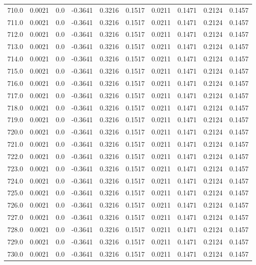 \begin{longtable}{lrrrrrrrrr}
710.0 & 0.0021 & 0.0 & -0.3641 & 0.3216 & 0.1517 & 0.0211 & 0.1471 & 0.2124 & 0.1457 \\
711.0 & 0.0021 & 0.0 & -0.3641 & 0.3216 & 0.1517 & 0.0211 & 0.1471 & 0.2124 & 0.1457 \\
712.0 & 0.0021 & 0.0 & -0.3641 & 0.3216 & 0.1517 & 0.0211 & 0.1471 & 0.2124 & 0.1457 \\
713.0 & 0.0021 & 0.0 & -0.3641 & 0.3216 & 0.1517 & 0.0211 & 0.1471 & 0.2124 & 0.1457 \\
714.0 & 0.0021 & 0.0 & -0.3641 & 0.3216 & 0.1517 & 0.0211 & 0.1471 & 0.2124 & 0.1457 \\
715.0 & 0.0021 & 0.0 & -0.3641 & 0.3216 & 0.1517 & 0.0211 & 0.1471 & 0.2124 & 0.1457 \\
716.0 & 0.0021 & 0.0 & -0.3641 & 0.3216 & 0.1517 & 0.0211 & 0.1471 & 0.2124 & 0.1457 \\
717.0 & 0.0021 & 0.0 & -0.3641 & 0.3216 & 0.1517 & 0.0211 & 0.1471 & 0.2124 & 0.1457 \\
718.0 & 0.0021 & 0.0 & -0.3641 & 0.3216 & 0.1517 & 0.0211 & 0.1471 & 0.2124 & 0.1457 \\
719.0 & 0.0021 & 0.0 & -0.3641 & 0.3216 & 0.1517 & 0.0211 & 0.1471 & 0.2124 & 0.1457 \\
720.0 & 0.0021 & 0.0 & -0.3641 & 0.3216 & 0.1517 & 0.0211 & 0.1471 & 0.2124 & 0.1457 \\
721.0 & 0.0021 & 0.0 & -0.3641 & 0.3216 & 0.1517 & 0.0211 & 0.1471 & 0.2124 & 0.1457 \\
722.0 & 0.0021 & 0.0 & -0.3641 & 0.3216 & 0.1517 & 0.0211 & 0.1471 & 0.2124 & 0.1457 \\
723.0 & 0.0021 & 0.0 & -0.3641 & 0.3216 & 0.1517 & 0.0211 & 0.1471 & 0.2124 & 0.1457 \\
724.0 & 0.0021 & 0.0 & -0.3641 & 0.3216 & 0.1517 & 0.0211 & 0.1471 & 0.2124 & 0.1457 \\
725.0 & 0.0021 & 0.0 & -0.3641 & 0.3216 & 0.1517 & 0.0211 & 0.1471 & 0.2124 & 0.1457 \\
726.0 & 0.0021 & 0.0 & -0.3641 & 0.3216 & 0.1517 & 0.0211 & 0.1471 & 0.2124 & 0.1457 \\
727.0 & 0.0021 & 0.0 & -0.3641 & 0.3216 & 0.1517 & 0.0211 & 0.1471 & 0.2124 & 0.1457 \\
728.0 & 0.0021 & 0.0 & -0.3641 & 0.3216 & 0.1517 & 0.0211 & 0.1471 & 0.2124 & 0.1457 \\
729.0 & 0.0021 & 0.0 & -0.3641 & 0.3216 & 0.1517 & 0.0211 & 0.1471 & 0.2124 & 0.1457 \\
730.0 & 0.0021 & 0.0 & -0.3641 & 0.3216 & 0.1517 & 0.0211 & 0.1471 & 0.2124 & 0.1457 \\

\end{longtable}
